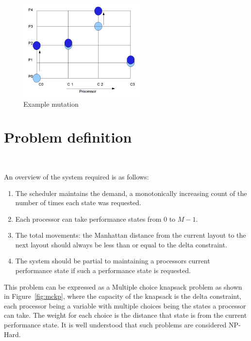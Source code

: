 \begin{figure}[h!]
  \begin{center}
    \includegraphics[height=2in]{Figures/example_mutation_3.png}%
    \caption{Example mutation}
    \label{fig:ex_mutation}
  \end{center}
\end{figure}



\section{Problem definition}~\label{sec:ago}

An overview of the system required is as follows:
\begin{enumerate}
\item The scheduler maintains the demand, a monotonically increasing count of the number
of times each state was requested. 
\item Each processor can take performance states from $0$ to $M-1$. 
\item The total movements: the Manhattan distance from the current layout to the next layout 
should always be less than or equal to the delta constraint. 
\item The system should be partial to maintaining a processors current performance state if such a performance state is requested.
\end{enumerate}

This problem can be expressed as a Multiple choice knapsack problem as shown in Figure~\ref{fig:mckp}, where the capacity of the knapsack 
is the delta constraint, each processor being a variable with multiple choices being the states 
a processor can take. The weight for each choice is the distance that state is from the current 
performance state. It is well understood that such problems are considered NP-Hard.

